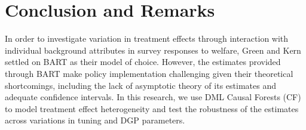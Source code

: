 \documentclass[12pt]{article}
\begin{document}
\begin{table}[H]
\begin{subtable}{\textwidth}
\vspace{0.5cm}
\caption{\label{table:twof}Number of Estimators} 
\end{subtable}
\end{table}



\clearpage
\section{Conclusion and Remarks}
In order to investigate variation in treatment effects through interaction with
individual background attributes in survey responses to welfare, Green and Kern
settled on BART as their model of choice. However, the estimates provided
through BART make policy implementation challenging given their theoretical
shortcomings, including the lack of asymptotic theory of its estimates and
adequate confidence intervals. In this research, we use DML Causal Forests (CF)
to model treatment effect heterogeneity and test the robustness of the estimates
across variations in tuning and DGP parameters. \\
\end{document}
